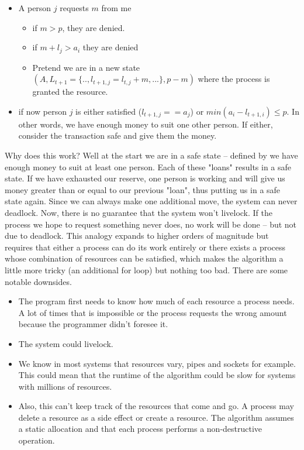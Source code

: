\begin{itemize}
	\item A person $j$ requests $m$ from me
	      \begin{itemize}
	      	\item if $m > p$, they are denied.
	      	\item if $m + l_j > a_i$ they are denied
	      	\item Pretend we are in a new state $(A, L_{t+1}=\{.., l_{t+1, j} = l_{t, j} + m, ...\}, p - m)$ where the process is granted the resource.
	      \end{itemize}
	\item if now person $j$ is either satisfied ($l_{t+1,j} == a_j$) or $min(a_i - l_{t+1, i}) \leq p$. In other words, we have enough money to suit one other person. If either, consider the transaction safe and give them the money.
\end{itemize}

Why does this work? Well at the start we are in a safe state -- defined by we have enough money to suit at least one person.
Each of these "loans" results in a safe state.
If we have exhausted our reserve, one person is working and will give us money greater than or equal to our previous "loan", thus putting us in a safe state again.
Since we can always make one additional move, the system can never deadlock.
Now, there is no guarantee that the system won't livelock.
If the process we hope to request something never does, no work will be done -- but not due to deadlock.
This analogy expands to higher orders of magnitude but requires that either a process can do its work entirely or there exists a process whose combination of resources can be satisfied, which makes the algorithm a little more tricky (an additional for loop) but nothing too bad.
There are some notable downsides.

\begin{itemize}
	\item The program first needs to know how much of each resource a process needs. A lot of times that is impossible or the process requests the wrong amount because the programmer didn't foresee it.
	\item The system could livelock.
	\item We know in most systems that resources vary, pipes and sockets for example. This could mean that the runtime of the algorithm could be slow for systems with millions of resources.
	\item Also, this can't keep track of the resources that come and go. A process may delete a resource as a side effect or create a resource. The algorithm assumes a static allocation and that each process performs a non-destructive operation.
\end{itemize}

